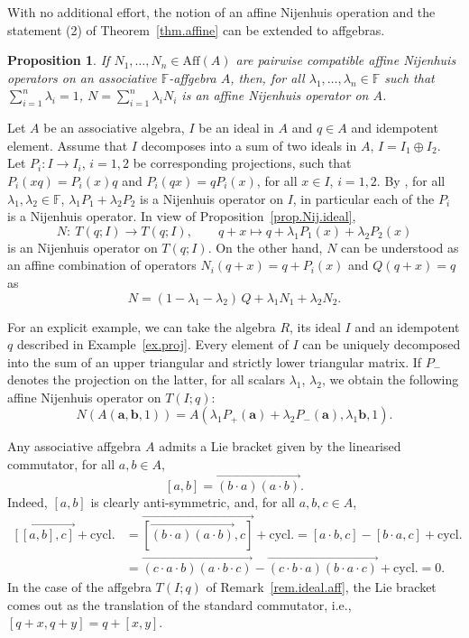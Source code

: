 \documentclass[10pt,a4paper]{amsart}
\numberwithin{equation}{section}
\newtheorem{Proposition}[Theorem]{Proposition}
 { \theoremstyle{definition}
\newtheorem{Definition}[Theorem]{Definition}
\newtheorem{Note}[Theorem]{Note}
\newtheorem{Example}[Theorem]{Example}
\newtheorem{Remark}[Theorem]{Remark}}
\newcommand{\F}{\mathbb F}
\begin{document}
With no additional effort, the notion of an affine Nijenhuis operation and the statement (2) of Theorem~\ref{thm.affine} can be extended to affgebras.

\begin{Proposition}\label{prop.affine}
 If $N_1,\dots , N_n\in \mathrm{Aff}(A)$ are pairwise compatible affine Nijenhuis operators on an associative $\F$-affgebra $A$, then, for all $\lambda_1,\dots, \lambda_n\in \F$ such that $\sum_{i=1}^n\lambda_i =1$,
 $N = \sum_{i=1}^n \lambda_i N_i $
 is an affine Nijenhuis operator on $A$.
\end{Proposition}

\begin{Example}
 Let $A$ be an associative algebra, $I$ be an ideal in $A$ and $q\in A$ and idempotent element. Assume that $I$ decomposes into a sum of two ideals in $A$, $I=I_1\oplus I_2$. Let $P_i\colon I\to I_i$, $i=1,2$ be corresponding projections, such that $P_i(xq) = P_i(x)q$ and $P_i(qx) = qP_i(x)$, for all $x\in I$, $i=1,2$. By \cite[Theorem~5]{4}, for all $\lambda_1,\lambda_2 \in \F$, $\lambda_1P_1+\lambda_2P_2$ is a Nijenhuis operator on $I$, in particular each of the $P_i$ is a Nijenhuis operator. In view of Proposition~\ref{prop.Nij.ideal},
 \[
 N\colon\ T(q;I) \to T(q;I), \qquad q+x \mapsto q + \lambda_1 P_1(x) + \lambda_2 P_2(x)
 \]
 is an Nijenhuis operator on $T(q;I)$. On the other hand, $N$ can be understood as an affine combination of operators $N_i(q+x) = q +P_i(x)$ and $Q(q+x) = q$ as
 \[N= (1-\lambda_1-\lambda_2)\,Q + \lambda_1 N_1 +\lambda_2 N_2.
 \]

 For an explicit example, we can take the algebra $R$, its ideal $I$ and an idempotent $q$ described in Example~\ref{ex.proj}. Every element of $I$ can be uniquely decomposed into the sum of an upper triangular and strictly lower triangular matrix. If $P_-$ denotes the projection on the latter, for all scalars $\lambda_1$, $\lambda_2$, we obtain the following affine Nijenhuis operator on $T(I;q)$:
 \[
 N(A(\mathbf{a},\mathbf{b},1)) = A(\lambda_1P_+(\mathbf{a})+\lambda_2P_-(\mathbf{a}),\lambda_1\mathbf{b},1).
 \]
\end{Example}

Any associative affgebra $A$ admits a Lie bracket given by the linearised commutator, for all $a,b\in A$,
\begin{equation}\label{affine.com}
 [a,b] =\overrightarrow{(b\cdot a)(a\cdot b)}.
\end{equation}
Indeed, $[a,b]$ is clearly anti-symmetric, and, for all $a,b,c\in A$,
\begin{align*}
 \overrightarrow{[[a,b],c]} + \mathrm{cycl.} &= \overrightarrow{\left[\overrightarrow{(b\cdot a)(a\cdot b)},c\right]} +\mathrm{cycl.}
 = [a\cdot b,c] - [b\cdot a,c] + \mathrm{cycl.}\\ &= \overrightarrow{(c\cdot a\cdot b)(a\cdot b\cdot c)} - \overrightarrow{(c\cdot b\cdot a)(b\cdot a\cdot c)} + \mathrm{cycl.} =0.
\end{align*}
In the case of the affgebra $T(I;q)$ of Remark~\ref{rem.ideal.aff}, the Lie bracket comes out as the translation of the standard commutator, i.e., $[q+x,q+y]= q+[x,y]$.
\end{document}
